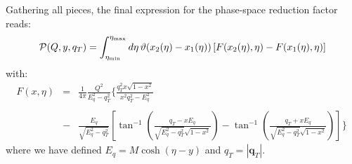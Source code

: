 \documentclass[10pt,a4paper]{article}
\begin{document}
Gathering all pieces, the final expression for the phase-space
reduction factor reads:
\begin{equation}\label{eq:finalformula}
  \mathcal{P}(Q,y,q_T)=\displaystyle \int_{\eta_{\rm
      min}}^{\eta_{\rm
      max}}d\eta\,\vartheta(x_2(\eta)-x_1(\eta))\left[F(x_2(\eta),\eta)-F(x_1(\eta) ,\eta)\right]
\end{equation}
with:
\begin{equation}\label{eq:integrandF}
\begin{array}{rcl}
\displaystyle F(x ,\eta)&=&\displaystyle \frac{1}{4\pi}\frac{Q^2}{E_q^2-q_T^2}\Bigg\{\frac{q_T^2 x\sqrt{1-x^2}}{x^2 q_T^2-
  E_q^2}\\
\\
&-&\displaystyle \frac{E_q}{\sqrt{E_q^2-q_T^2}}\left[\tan^{-1}\left(\frac{q_T-
    xE_q}{\sqrt{E_q^2-q_T^2}\sqrt{1-x^2}}\right)-\displaystyle\tan^{-1}\left(\frac{q_T+
    xE_q}{\sqrt{E_q^2-q_T^2}\sqrt{1-x^2}}\right)\right]\Bigg\}\
\end{array}
\end{equation}
where we have defined $E_q = M\cosh(\eta-y)$ and
$q_T=|\mathbf{q}_T|$.
\end{document}
